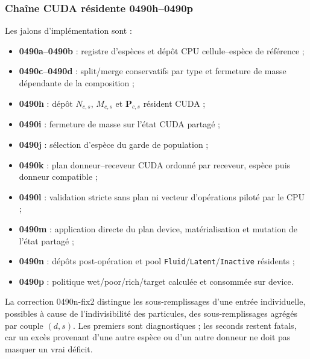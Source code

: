 \documentclass[11pt,a4paper]{article}
\begin{document}
\subsubsection{Chaîne CUDA résidente 0490h--0490p}

Les jalons d'implémentation sont :
\begin{itemize}[nosep]
  \item \textbf{0490a--0490b} : registre d'espèces et dépôt CPU cellule--espèce de référence ;
  \item \textbf{0490c--0490d} : split/merge conservatifs par type et fermeture de masse dépendante de la composition ;
  \item \textbf{0490h} : dépôt $N_{c,s}$, $M_{c,s}$ et $\bm{P}_{c,s}$ résident CUDA ;
  \item \textbf{0490i} : fermeture de masse sur l'état CUDA partagé ;
  \item \textbf{0490j} : sélection d'espèce du garde de population ;
  \item \textbf{0490k} : plan donneur--receveur CUDA ordonné par receveur, espèce puis donneur compatible ;
  \item \textbf{0490l} : validation stricte sans plan ni vecteur d'opérations piloté par le CPU ;
  \item \textbf{0490m} : application directe du plan device, matérialisation et mutation de l'état partagé ;
  \item \textbf{0490n} : dépôts post-opération et pool \texttt{Fluid}/\texttt{Latent}/\texttt{Inactive} résidents ;
  \item \textbf{0490p} : politique wet/poor/rich/target calculée et consommée sur device.
\end{itemize}

La correction 0490n-fix2 distingue les sous-remplissages d'une entrée individuelle, possibles à cause de l'indivisibilité des particules, des sous-remplissages agrégés par couple $(d,s)$. Les premiers sont diagnostiques ; les seconds restent fatals, car un excès provenant d'une autre espèce ou d'un autre donneur ne doit pas masquer un vrai déficit.
\end{document}
